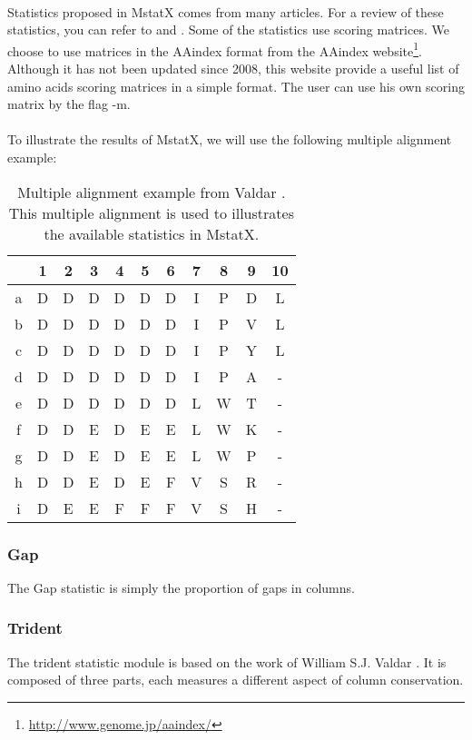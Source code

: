 \documentclass[12pt]{report}
\begin{document}
\paragraph{}
Statistics proposed in MstatX comes from many articles. For a review of these statistics, you can refer to  \cite{Valdar-2002} and  \cite{Johansson-2010}. Some of the statistics use scoring matrices. We choose to use matrices in the AAindex format \cite{Kawashima-2008} from the AAindex website\footnote{\url{http://www.genome.jp/aaindex/}}.
Although it has not been updated since 2008, this website provide a useful list of amino acids scoring matrices in a simple format.
The user can use his own scoring matrix by the flag -m.

\paragraph{}
To illustrate the results of MstatX, we will use the following multiple alignment example:
\begin{table}
\begin{center}
\begin{tabular}{c|cccccccccc}
  &1&2&3&4&5&6&7&8&9&10\\
  \hline
a&D&D&D&D&D&D&I&P&D&L\\
b&D&D&D&D&D&D&I&P&V&L\\
c&D&D&D&D&D&D&I&P&Y&L\\
d&D&D&D&D&D&D&I&P&A&-\\
e&D&D&D&D&D&D&L&W&T&-\\
f&D&D&E&D&E&E&L&W&K&-\\
g&D&D&E&D&E&E&L&W&P&-\\
h&D&D&E&D&E&F&V&S&R&-\\
i&D&E&E&F&F&F&V&S&H&-
\end{tabular}
\end{center}
\caption{Multiple alignment example from Valdar \cite{Valdar-2002}. This multiple alignment is used to illustrates the available statistics in MstatX.}
\end{table}

\subsubsection{Gap}
\label{gap_stat}
The Gap statistic is simply the proportion of gaps in columns.

\subsubsection{Trident}
\label{trid_stat}
The trident statistic module is based on the work of William S.J. Valdar \cite{Valdar-2002}.
It is composed of three parts, each measures a different aspect of column conservation.\\
\end{document}
